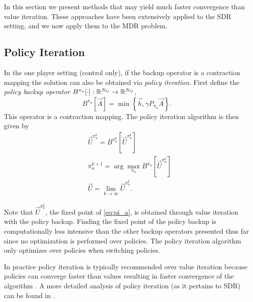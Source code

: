 In this section we present methods that may yield much faster convergence than value iteration. These approaches have been extensively applied to the SDR setting, and we now apply them to the MDR problem. 

\subsection{Policy Iteration}

In the one player setting (control only), if the backup operator is a contraction mapping the solution can also be obtained via \emph{policy iteration}. First define the \emph{policy backup operator} $B^{\pi_u}[\cdot]: \mathbb{R}^{N_G} \rightarrow \mathbb{R}^{N_G}$, 
%
\begin{equation} \label{eq:backup_policy}
B^{\pi_u}[\vec{A}] = \min\left\{ \vec{h}, \gamma P_{\pi_u} \vec{A} \right \}.
\end{equation}%
\noindent This operator is a contraction mapping. The policy iteration algorithm is then given by
%
\begin{subequations}\label{eq:pi}
\begin{align}
&\vec{U}^{\pi_u^k} = B^{\pi_u^k}[\vec{U}^{\pi_u^k}] \label{eq:pi_a}\\
&\pi_u^{k+1} = \arg\underset{\pi_u}{\max}B^{\pi_u}[\vec{U}^{\pi_u^k}]\\ 
&\vec{U} = \lim_{k\rightarrow \infty} \vec{U}^{\pi_u^k}.
\end{align}
\end{subequations}

Note that ${\vec{U}^{\pi_u^k}}$, the fixed point of \eqref{eq:pi_a}, is obtained through value iteration with the policy backup. Finding the fixed point of the policy backup is computationally less intensive than the other backup operators presented thus far since no optimization is performed over policies. The policy iteration algorithm only optimizes over policies when switching policies.  

In practice policy iteration is typically recommended over value iteration because policies can converge faster than values resulting in faster convergence of the algorithm \cite{Russell2003}. A more detailed analysis of policy iteration (as it pertains to SDR) can be found in \cite{Howard1964, Puterman1979}. 

